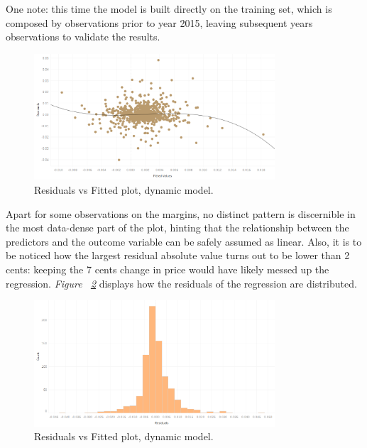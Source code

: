 \documentclass[a4paper,12pt]{book}
\begin{document}
One note: this time the model is built directly on the training set, which is composed by observations prior to year 2015, leaving subsequent years observations to validate the results.

\begin{figure}[tb]
\begin{center}
\captionsetup{justification=centering}
\includegraphics[width=0.8\textwidth]{Images/dynres.png}
\caption{Residuals vs Fitted plot, dynamic model.}
\label{fig:dyn}
\end{center}
\end{figure}

Apart for some observations on the margins, no distinct pattern is discernible in the most data-dense part of the plot, hinting that the relationship between the predictors and the outcome variable can be safely assumed as linear. Also, it is to be noticed how the largest residual absolute value turns out to be lower than 2 cents: keeping the 7 cents change in price would have likely messed up the regression. \textit{Figure ~\ref{fig:dyno}} displays how the residuals of the regression are distributed.

\begin{figure}[tb]
\begin{center}
\captionsetup{justification=centering}
\includegraphics[width=0.8\textwidth]{Images/disres.png}
\caption{Residuals vs Fitted plot, dynamic model.}
\label{fig:dyno}
\end{center}
\end{figure}
\end{document}

